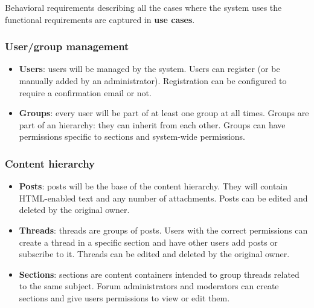 \documentclass[12pt]{report}
\renewcommand\emph{\textbf}
\begin{document}
                    Behavioral requirements describing all the cases where the system uses the functional requirements are captured in \emph{use cases}.

                    \subsubsection{User/group management}
                        \begin{itemize}
                            \item \emph{Users}: users will be managed by the system. Users can register (or be manually added by an administrator). Registration can be configured to require a confirmation email or not.
                            \item \emph{Groups}: every user will be part of at least one group at all times. Groups are part of an hierarchy: they can inherit from each other. Groups can have permissions specific to sections and system-wide permissions.
                        \end{itemize}

                     \subsubsection{Content hierarchy}
                        \begin{itemize}
                            \item \emph{Posts}: posts will be the base of the content hierarchy. They will contain HTML-enabled text and any number of attachments.
                            Posts can be edited and deleted by the original owner.
                            \item \emph{Threads}: threads are groups of posts. Users with the correct permissions can create a thread in a specific section and have other users add posts or subscribe to it.
                            Threads can be edited and deleted by the original owner.
                            \item \emph{Sections}: sections are content containers intended to group threads related to the same subject. Forum administrators and moderators can create sections and give users permissions to view or edit them.
                        \end{itemize}
\end{document}
